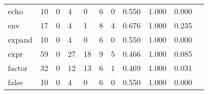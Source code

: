 \begin{longtable}{lp{1.2cm}p{1.2cm}p{1.2cm}p{1.2cm}p{1.2cm}p{1.2cm}p{1.2cm}p{1.2cm}p{1.2cm}p{1.2cm}}
echo      &                                    10 &                                                  0 &                                                  4 &                                                  0 &                                                  6 &                                                  0 &                                         0.550 &                                              1.000 &                                              0.000 \\
env       &                                    17 &                                                  0 &                                                  4 &                                                  1 &                                                  8 &                                                  4 &                                         0.676 &                                              1.000 &                                              0.235 \\
expand    &                                    10 &                                                  0 &                                                  4 &                                                  0 &                                                  6 &                                                  0 &                                         0.550 &                                              1.000 &                                              0.000 \\
expr      &                                    59 &                                                  0 &                                                 27 &                                                 18 &                                                  9 &                                                  5 &                                         0.466 &                                              1.000 &                                              0.085 \\
factor    &                                    32 &                                                  0 &                                                 12 &                                                 13 &                                                  6 &                                                  1 &                                         0.469 &                                              1.000 &                                              0.031 \\
false     &                                    10 &                                                  0 &                                                  4 &                                                  0 &                                                  6 &                                                  0 &                                         0.550 &                                              1.000 &                                              0.000 \\

\end{longtable}
